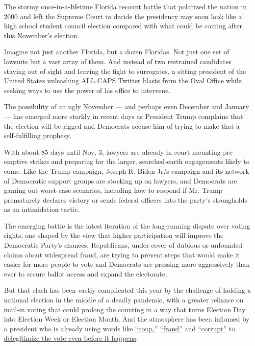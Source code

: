 The stormy once-in-a-lifetime
\href{https://www.nytimes.com/2000/12/13/us/bush-prevails-single-vote-justices-end-recount-blocking-gore-after-5-week.html}{Florida
recount battle} that polarized the nation in 2000 and left the Supreme
Court to decide the presidency may soon look like a high school student
council election compared with what could be coming after this
November's election.

Imagine not just another Florida, but a dozen Floridas. Not just one set
of lawsuits but a vast array of them. And instead of two restrained
candidates staying out of sight and leaving the fight to surrogates, a
sitting president of the United States unleashing ALL CAPS Twitter
blasts from the Oval Office while seeking ways to use the power of his
office to intervene.

The possibility of an ugly November --- and perhaps even December and
January --- has emerged more starkly in recent days as President Trump
complains that the election will be rigged and Democrats accuse him of
trying to make that a self-fulfilling prophesy.

With about 85 days until Nov. 3, lawyers are already in court mounting
pre-emptive strikes and preparing for the larger, scorched-earth
engagements likely to come. Like the Trump campaign, Joseph R. Biden
Jr.'s campaign and its network of Democratic support groups are stocking
up on lawyers, and Democrats are gaming out worst-case scenarios,
including how to respond if Mr. Trump prematurely declares victory or
sends federal officers into the party's strongholds as an intimidation
tactic.

The emerging battle is the latest iteration of the long-running dispute
over voting rights, one shaped by the view that higher participation
will improve the Democratic Party's chances. Republicans, under cover of
dubious or unfounded claims about widespread fraud, are trying to
prevent steps that would make it easier for more people to vote and
Democrats are pressing more aggressively than ever to secure ballot
access and expand the electorate.

But that clash has been vastly complicated this year by the challenge of
holding a national election in the middle of a deadly pandemic, with a
greater reliance on mail-in voting that could prolong the counting in a
way that turns Election Day into Election Week or Election Month. And
the atmosphere has been inflamed by a president who is already using
words like
\href{https://twitter.com/realDonaldTrump/status/1290250416278532096}{``coup,''}
\href{https://twitter.com/realDonaldTrump/status/1266172570983940101}{``fraud''}
and
\href{https://twitter.com/realDonaldTrump/status/1285540318503407622?s=20}{``corrupt''}
to
\href{https://www.nytimes.com/2020/07/31/us/politics/trump-tweet-democracy.html}{delegitimize
the vote even before it happens}.

